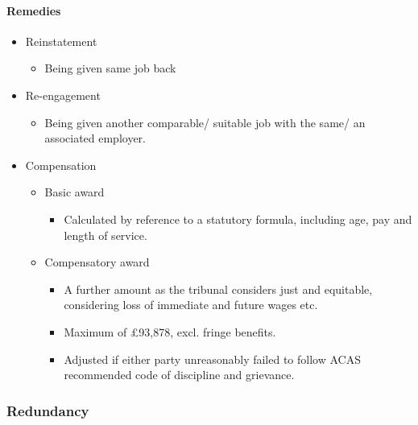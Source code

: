 \documentclass[
]{article}
\providecommand{\tightlist}{%
  \setlength{\itemsep}{0pt}\setlength{\parskip}{0pt}}
\begin{document}
\hypertarget{remedies}{%
\paragraph{Remedies}\label{remedies}}

\begin{itemize}
\tightlist
\item
  Reinstatement

  \begin{itemize}
  \tightlist
  \item
    Being given same job back
  \end{itemize}
\item
  Re-engagement

  \begin{itemize}
  \tightlist
  \item
    Being given another comparable/ suitable job with the same/ an
    associated employer.
  \end{itemize}
\item
  Compensation

  \begin{itemize}
  \tightlist
  \item
    Basic award

    \begin{itemize}
    \tightlist
    \item
      Calculated by reference to a statutory formula, including age, pay
      and length of service.
    \end{itemize}
  \item
    Compensatory award

    \begin{itemize}
    \tightlist
    \item
      A further amount as the tribunal considers just and equitable,
      considering loss of immediate and future wages etc.
    \item
      Maximum of £93,878, excl. fringe benefits.
    \item
      Adjusted if either party unreasonably failed to follow ACAS
      recommended code of discipline and grievance.
    \end{itemize}
  \end{itemize}
\end{itemize}

\hypertarget{redundancy}{%
\subsubsection{Redundancy}\label{redundancy}}
\end{document}
